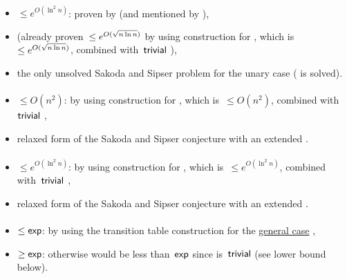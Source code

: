 \paragraph{\TNFA{}\tto\TDFA}\label{cost:2NFAto2DFAu}
\begin{itemize}
	\item $\le e^{O(\ln^2n)}$: proven by  (and mentioned by ),
	\item (already proven~$\le e^{O(\sqrt{n\ln n})}$ by using construction for \hyperref[cost:2NFAto1DFAu]{\TNFA{}\tto\ODFA}, which is~$\le e^{O(\sqrt{n\ln n})}$, combined with~$\mathsf{trivial}$ \ODFA{}\tto\TDFA),
	\item the only unsolved Sakoda and Sipser problem for the unary case (\hyperref[cost:1NFAto2DFAu]{\ONFA{}\tto\TDFA} is solved).
\end{itemize}
\paragraph{\ONFA{}\tto\ODLA}\label{cost:1NFAto1DLAu}
\begin{itemize}
	\item $\le O(n^2)$: by using construction for \hyperref[cost:1NFAto2DFAu]{\ONFA{}\tto\TDFA}, which is~$\le O(n^2)$, combined with~$\mathsf{trivial}$ \TDFA{}\tto\ODLA,
	\item relaxed form of the Sakoda and Sipser conjecture with an extended \TDFA.
\end{itemize}
\paragraph{\TNFA{}\tto\ODLA}
\begin{itemize}
	\item $\le e^{O(\ln^2n)}$: by using construction for \hyperref[cost:2NFAto2DFAu]{\TNFA{}\tto\TDFA}, which is~$\le e^{O(\ln^2n)}$, combined with~$\mathsf{trivial}$ \TDFA{}\tto\ODLA,
	\item relaxed form of the Sakoda and Sipser conjecture with an extended \TDFA.
\end{itemize}
\paragraph{\ODLA{}\tto\ODFA}\label{cost:1DLAto1DFAu}
\begin{itemize}
	\item $\le\mathsf{exp}$: by using the transition table construction for the \hyperref[cost:1DLAto1DFA]{general case} \cite{PigPis14},
	\item $\ge\mathsf{exp}$: otherwise \hyperref[cost:1DLAto2NFAu]{\ODLA{}\tto\TNFA} would be less than~$\mathsf{exp}$ since \ODFA{}\tto\TNFA is~$\mathsf{trivial}$ (see lower bound below).
\end{itemize}
